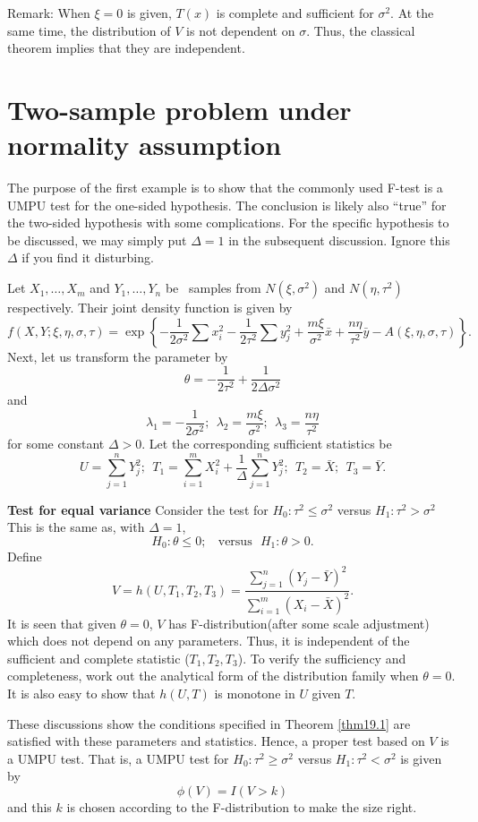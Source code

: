 Remark: When $\xi = 0$ is given, $T(x)$ is complete and sufficient for $\sigma^2$.
At the same time, the distribution of $V$ is not dependent on $\sigma$. Thus,
the classical theorem implies that they are independent.


\section{Two-sample problem under normality assumption}

The purpose of the first example is to show that the commonly used
F-test is a UMPU test for the one-sided hypothesis. The conclusion is
likely also ``true'' for the two-sided hypothesis with some complications.
For the specific hypothesis to be discussed, we may simply put
$\Delta = 1$ in the subsequent discussion. Ignore this $\Delta$
if you find it disturbing.


Let $X_1, \ldots, X_m$ and $Y_1, \ldots, Y_n$ be \iid\ samples from
$N(\xi, \sigma^2)$ and $N(\eta, \tau^2)$ respectively. Their joint
density function is given by
\[
f(X, Y; \xi, \eta, \sigma, \tau)
=
\exp \left \{ 
- \frac{1}{2 \sigma^2} \sum x_i^2 - \frac{1}{2 \tau^2} \sum y_j^2 
+ \frac{m\xi}{\sigma^2} \bar x + \frac{n \eta}{\tau^2} \bar y 
- A( \xi, \eta, \sigma, \tau) 
\right \}.
\]
Next, let us transform the parameter by
\[
\theta = - \frac{1}{2 \tau^2} + \frac{ 1}{2 \Delta \sigma^2}
\]
and
\[
\lambda_1 = - \frac{1}{2 \sigma^2};~~
\lambda_2 = \frac{m\xi}{\sigma^2};~~
\lambda_3 = \frac{n \eta}{\tau^2}
\]
for some constant $\Delta > 0$.
Let the corresponding sufficient statistics be
\[
U = \sum_{j=1}^n Y_j^2; ~~
T_1 = \sum_{i=1}^m X_i^2 + \frac{1}{\Delta} \sum_{j=1}^n Y_j^2;~~
T_2 = \bar X; ~~T_3 = \bar Y.
\]

\vs
\noindent
{\bf Test for equal variance}
Consider the test for $H_0: \tau^2 \leq \sigma^2$ versus 
$H_1: \tau^2 > \sigma^2$
This is the same as, with $\Delta = 1$,
\[
H_0: \theta \leq 0; ~~~~\mbox{versus} ~~~H_1: \theta > 0.
\]
Define
\[
V = h(U, T_1, T_2, T_3) 
= \frac{ \sum_{j=1}^n (Y_j - \bar Y)^2}{\sum_{i=1}^m (X_i - \bar X)^2}.
\]
It is seen that given $\theta = 0$, $V$ has F-distribution(after 
some scale adjustment) which
does not depend on any parameters. Thus, it is independent of
the sufficient and complete statistic ($T_1, T_2, T_3$).
To verify the sufficiency and completeness,
work out the analytical form of the distribution family
when $\theta=0$.
It is also easy to show that $h(U, T)$ is monotone in $U$
given $T$. 

These discussions show the conditions specified in Theorem
\ref{thm19.1} are satisfied with these parameters and statistics.
Hence, a proper test based on $V$ is a UMPU test.
That is, a UMPU test for $H_0: \tau^2 \geq \sigma^2$ versus 
$H_1: \tau^2 < \sigma^2$ is given by
\[
\phi(V) = I(V > k)
\]
and this $k$ is chosen according to the F-distribution to make
the size right.

